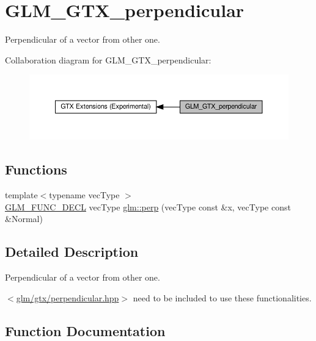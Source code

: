 \hypertarget{group__gtx__perpendicular}{}\section{G\+L\+M\+\_\+\+G\+T\+X\+\_\+perpendicular}
\label{group__gtx__perpendicular}


Perpendicular of a vector from other one.  


Collaboration diagram for G\+L\+M\+\_\+\+G\+T\+X\+\_\+perpendicular\+:\nopagebreak
\begin{figure}[H]
\begin{center}
\leavevmode
\includegraphics[width=350pt]{group__gtx__perpendicular}
\end{center}
\end{figure}
\subsection*{Functions}
\begin{DoxyCompactItemize}
\item 
{\footnotesize template$<$typename vec\+Type $>$ }\\\hyperlink{setup_8hpp_ab2d052de21a70539923e9bcbf6e83a51}{G\+L\+M\+\_\+\+F\+U\+N\+C\+\_\+\+D\+E\+CL} vec\+Type \hyperlink{group__gtx__perpendicular_ga41f8c73da9798a18e6b1e32f1e301f07}{glm\+::perp} (vec\+Type const \&x, vec\+Type const \&Normal)
\end{DoxyCompactItemize}


\subsection{Detailed Description}
Perpendicular of a vector from other one. 

$<$\hyperlink{perpendicular_8hpp}{glm/gtx/perpendicular.\+hpp}$>$ need to be included to use these functionalities. 

\subsection{Function Documentation}
\mbox{\label{group__gtx__perpendicular_ga41f8c73da9798a18e6b1e32f1e301f07}} 
